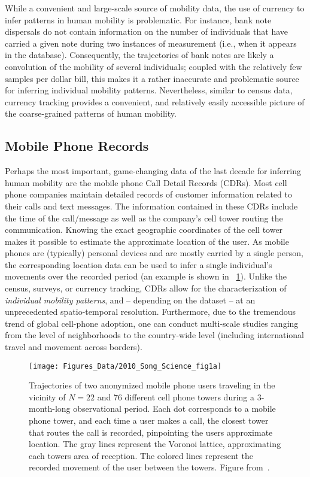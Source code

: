 While a convenient and large-scale source of mobility data, the use of currency to infer patterns in human mobility is problematic. For instance, bank note dispersals do not contain information on the number of individuals that have carried a given note during two instances of measurement (i.e., when it appears in the database). Consequently, the trajectories of bank notes are likely a convolution of the mobility of several individuals; coupled with the relatively few samples per dollar bill,  this makes it a rather inaccurate and  problematic source for inferring individual mobility patterns. Nevertheless, similar to census data, currency tracking provides a convenient, and relatively easily accessible picture of the coarse-grained patterns of human mobility. 


\subsection{Mobile Phone Records}
\label{sec:cdr}

Perhaps the most important, game-changing data of the last decade for inferring human mobility are the mobile phone Call Detail Records (CDRs). Most cell phone companies maintain detailed records of customer information related to their calls and text messages. The information contained in these CDRs include the time of the call/message as well as the company's cell tower routing the communication. Knowing the exact geographic coordinates of the cell tower makes it possible to estimate the approximate location of the user. As mobile phones are (typically) personal devices and are mostly carried by a single person, the corresponding location data can be used to infer a single individual's movements over the recorded period (an example is shown in \figurename~\ref{fig:2010_Song_Science_fig1a}). Unlike the census, surveys, or currency tracking, CDRs allow for the characterization of  \emph{individual mobility patterns}, and -- depending on the dataset -- at an unprecedented spatio-temporal resolution. Furthermore, due to the tremendous trend of global cell-phone adoption, one can conduct multi-scale studies ranging from the level of neighborhoods to the country-wide level (including international travel and movement across borders).

\begin{figure}[t!]
\centering
\texttt{[image: Figures\_Data/2010\_Song\_Science\_fig1a]}
\caption{Trajectories of two anonymized mobile phone users traveling in the vicinity of $N = 22$ and $76$ different cell phone towers during a 3-month-long observational period. Each dot corresponds to a mobile phone tower, and each time a user makes a call, the closest tower that routes the call is recorded, pinpointing the users approximate location. The gray lines represent the Voronoi lattice, approximating each towers area of reception. The colored lines represent the recorded movement of the user between the towers. Figure from~\cite{Song_2010_Limits}.}
\label{fig:2010_Song_Science_fig1a}
\end{figure}


